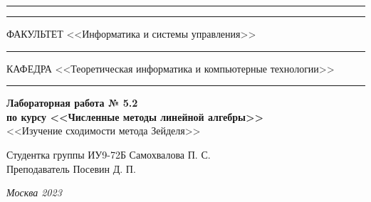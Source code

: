 \documentclass[a4paper, 14pt]{extarticle}
\begin{document}
\begin{titlepage}
\vspace{-25pt}
\hspace{-35pt}\rule{\textwidth}{2.3pt}

\vspace*{-20.3pt}
\hspace{-35pt}\rule{\textwidth}{0.4pt}

\vspace{1.5ex}
\hspace{-35pt} \noindent \small ФАКУЛЬТЕТ\hspace{80pt} <<Информатика и системы управления>>

\vspace*{-16pt}
\hspace{47pt}\rule{0.83\textwidth}{0.4pt}

\vspace{0.5ex}
\hspace{-35pt} \noindent \small КАФЕДРА\hspace{50pt} <<Теоретическая информатика и компьютерные технологии>>

\vspace*{-16pt}
\hspace{30pt}\rule{0.866\textwidth}{0.4pt}
  
\vspace{11em}

\begin{center}
\Large {\bf Лабораторная работа № 5.2} \\
\large {\bf по курсу <<Численные методы линейной алгебры>>} \\
\large <<Изучение сходимости метода Зейделя>>
\end{center}\normalsize

\vspace{8em}


\begin{flushright}
  {Студентка группы ИУ9-72Б Самохвалова П. С. \hspace*{15pt}\\
  \vspace{2ex}
  Преподаватель Посевин Д. П.\hspace*{15pt}}
\end{flushright}

\bigskip

\vfill
 

\begin{center}
\textsl{Москва 2023}
\end{center}
\end{titlepage}
\end{document}
